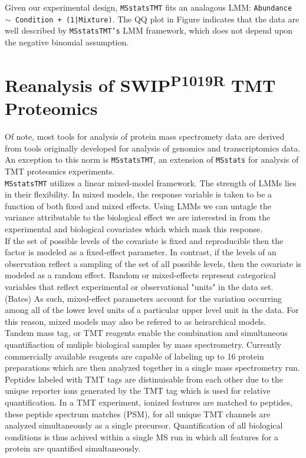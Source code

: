\documentclass[11pt]{elife}\usepackage[]{graphicx}\usepackage[]{color}
\begin{document}
Given our experimental design, \texttt{MSstatsTMT} fits an analagous LMM:
\texttt{Abundance $\sim$ Condition + (1|Mixture)}. 
The QQ plot in Figure indicates that the data are well described by
\texttt{MSstatsTMT's} LMM framework, which 
does not depend upon the negative binomial assumption.


\section{Reanalysis of SWIP\textsuperscript{P1019R} TMT Proteomics}

Of note, most tools for analysis of protein mass spectromety data are derived
from tools originally developed for analysis of genomics and transcriptomics
data. An exception to this norm is \texttt{MSstatsTMT}, an extension of 
\texttt{MSstats} for analysis of TMT proteomics experiments.\\

\texttt{MSstatsTMT} utilizes a linear mixed-model framework. The strength of
LMMs lies in their flexibility. In mixed models, the response variable is 
taken to be a function of both fixed and mixed effects. Using LMMs we can 
untagle the variance attributable to the biological effect we
are interested in from the experimental and biological covariates which 
which mask this response.\\

If the set of possible levels of the covariate is
fixed and reproducible then the factor is modeled as a fixed-effect parameter.
In contrast, if the levels of an observation reflect a sampling of the
set of all possible levels, then the covariate is modeled as a random effect.
Random or mixed-effects represent categorical variables
that reflect experimental or observational "units" in the data set. (Bates)
As such, mixed-effect parameters account for the variation occurring among all 
of the lower level units of a particular upper level unit in the data. 
For this reason, mixed models may also be refered to as heirarchical models.\\

Tandem mass tag, or TMT reagents enable the combination and simultaneous
quantifiaction of muliple biological samples by mass spectrometry. Currently
commercially available reagents are capable of labeling up to 16 protein
preparations which are then analyzed together in a single mass spectrometry run.
Peptides labeled with TMT tags are distinuisable from each other due to the
unique reporter ions generated by the TMT tag which  is used for relative
quantification.  In a TMT experiment, ionized features are matched to peptides,
these peptide spectrum matches (PSM), for all unique TMT channels are analyzed
simultaneously as a single precursor. Quantification of all biological
conditions is thus achived within a single MS run in which all features for a
protein are quantified simultaneously.\\
\end{document}
